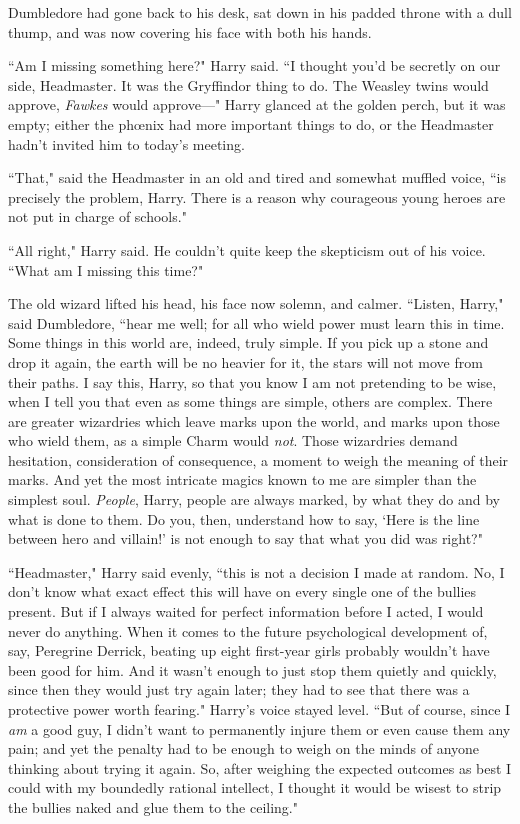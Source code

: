Dumbledore had gone back to his desk, sat down in his padded throne with a dull thump, and was now covering his face with both his hands.

``Am I missing something here?" Harry said. ``I thought you'd be secretly on our side, Headmaster. It was the Gryffindor thing to do. The Weasley twins would approve, \emph{Fawkes} would approve—" Harry glanced at the golden perch, but it was empty; either the phœnix had more important things to do, or the Headmaster hadn't invited him to today's meeting.

``That," said the Headmaster in an old and tired and somewhat muffled voice, ``is precisely the problem, Harry. There is a reason why courageous young heroes are not put in charge of schools."

``All right," Harry said. He couldn't quite keep the skepticism out of his voice. ``What am I missing this time?"

The old wizard lifted his head, his face now solemn, and calmer. ``Listen, Harry," said Dumbledore, ``hear me well; for all who wield power must learn this in time. Some things in this world are, indeed, truly simple. If you pick up a stone and drop it again, the earth will be no heavier for it, the stars will not move from their paths. I say this, Harry, so that you know I am not pretending to be wise, when I tell you that even as some things are simple, others are complex. There are greater wizardries which leave marks upon the world, and marks upon those who wield them, as a simple Charm would \emph{not}. Those wizardries demand hesitation, consideration of consequence, a moment to weigh the meaning of their marks. And yet the most intricate magics known to me are simpler than the simplest soul. \emph{People}, Harry, people are always marked, by what they do and by what is done to them. Do you, then, understand how to say, `Here is the line between hero and villain!' is not enough to say that what you did was right?"

``Headmaster," Harry said evenly, ``this is not a decision I made at random. No, I don't know what exact effect this will have on every single one of the bullies present. But if I always waited for perfect information before I acted, I would never do anything. When it comes to the future psychological development of, say, Peregrine Derrick, beating up eight first-year girls probably wouldn't have been good for him. And it wasn't enough to just stop them quietly and quickly, since then they would just try again later; they had to see that there was a protective power worth fearing." Harry's voice stayed level. ``But of course, since I \emph{am} a good guy, I didn't want to permanently injure them or even cause them any pain; and yet the penalty had to be enough to weigh on the minds of anyone thinking about trying it again. So, after weighing the expected outcomes as best I could with my boundedly rational intellect, I thought it would be wisest to strip the bullies naked and glue them to the ceiling."

